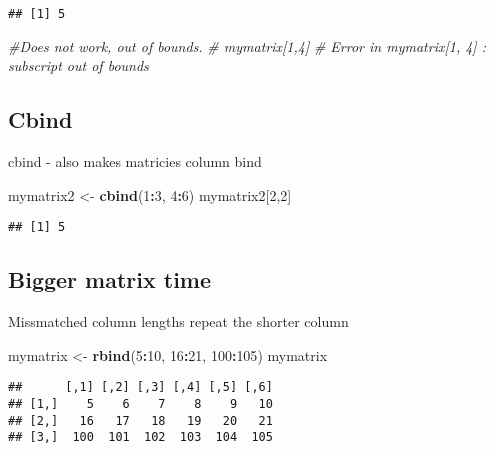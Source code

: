 \documentclass[
]{article}
\newenvironment{Shaded}{\begin{snugshade}}{\end{snugshade}}
\newcommand{\CommentTok}[1]{\textcolor[rgb]{0.56,0.35,0.01}{\textit{#1}}}
\newcommand{\DecValTok}[1]{\textcolor[rgb]{0.00,0.00,0.81}{#1}}
\newcommand{\KeywordTok}[1]{\textcolor[rgb]{0.13,0.29,0.53}{\textbf{#1}}}
\newcommand{\NormalTok}[1]{#1}
\newcommand{\OperatorTok}[1]{\textcolor[rgb]{0.81,0.36,0.00}{\textbf{#1}}}
\newcommand{\StringTok}[1]{\textcolor[rgb]{0.31,0.60,0.02}{#1}}
\begin{document}
\begin{verbatim}
## [1] 5
\end{verbatim}

\begin{Shaded}
\begin{Highlighting}[]
\CommentTok{#Does not work, out of bounds.}
\CommentTok{# mymatrix[1,4]}
\CommentTok{# Error in mymatrix[1, 4] : subscript out of bounds}
\end{Highlighting}
\end{Shaded}

\hypertarget{cbind}{%
\subsection{Cbind}\label{cbind}}

cbind - also makes matricies column bind

\begin{Shaded}
\begin{Highlighting}[]
\NormalTok{mymatrix2 <-}\StringTok{ }\KeywordTok{cbind}\NormalTok{(}\DecValTok{1}\OperatorTok{:}\DecValTok{3}\NormalTok{, }\DecValTok{4}\OperatorTok{:}\DecValTok{6}\NormalTok{)}
\NormalTok{mymatrix2[}\DecValTok{2}\NormalTok{,}\DecValTok{2}\NormalTok{]}
\end{Highlighting}
\end{Shaded}

\begin{verbatim}
## [1] 5
\end{verbatim}

\hypertarget{bigger-matrix-time}{%
\subsection{Bigger matrix time}\label{bigger-matrix-time}}

Missmatched column lengths repeat the shorter column

\begin{Shaded}
\begin{Highlighting}[]
\NormalTok{mymatrix <-}\StringTok{ }\KeywordTok{rbind}\NormalTok{(}\DecValTok{5}\OperatorTok{:}\DecValTok{10}\NormalTok{, }\DecValTok{16}\OperatorTok{:}\DecValTok{21}\NormalTok{, }\DecValTok{100}\OperatorTok{:}\DecValTok{105}\NormalTok{)}
\NormalTok{mymatrix}
\end{Highlighting}
\end{Shaded}

\begin{verbatim}
##      [,1] [,2] [,3] [,4] [,5] [,6]
## [1,]    5    6    7    8    9   10
## [2,]   16   17   18   19   20   21
## [3,]  100  101  102  103  104  105
\end{verbatim}
\end{document}
